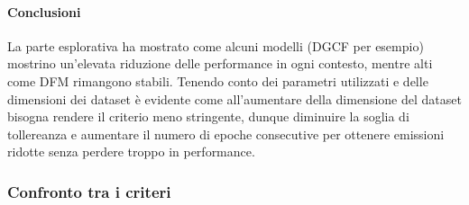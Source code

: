 \paragraph{Conclusioni} La parte esplorativa ha mostrato come alcuni modelli (DGCF per esempio) mostrino un'elevata riduzione delle performance in ogni contesto, mentre alti come DFM rimangono stabili.
Tenendo conto dei parametri utilizzati e delle dimensioni dei dataset è evidente come all'aumentare della dimensione del dataset bisogna rendere il criterio meno stringente, dunque diminuire la soglia di tollereanza e aumentare il numero di epoche consecutive per ottenere emissioni ridotte senza perdere troppo in performance.



\subsubsection{Confronto tra i criteri}

